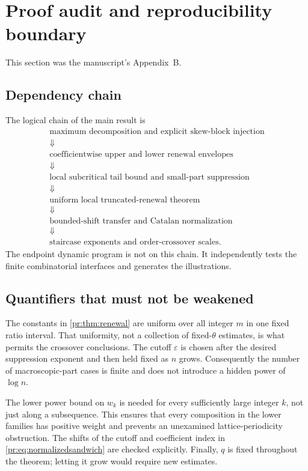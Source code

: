 \documentclass[11pt,a4paper]{article}
\theoremstyle{definition}\newaliascnt{definition}{theorem}
\theoremstyle{remark}\newaliascnt{remark}{theorem}
\begin{document}
\section{Proof audit and reproducibility boundary}
\label{pr:app:audit}
This section was the manuscript's Appendix~B.

\subsection{Dependency chain}
The logical chain of the main result is
\[
 \begin{gathered}
 \text{maximum decomposition and explicit skew-block injection}\\
 \Downarrow\\
 \text{coefficientwise upper and lower renewal envelopes}\\
 \Downarrow\\
 \text{local subcritical tail bound and small-part suppression}\\
 \Downarrow\\
 \text{uniform local truncated-renewal theorem}\\
 \Downarrow\\
 \text{bounded-shift transfer and Catalan normalization}\\
 \Downarrow\\
 \text{staircase exponents and order-crossover scales}.
 \end{gathered}
\]
The endpoint dynamic program is not on this chain. It independently tests
the finite combinatorial interfaces and generates the illustrations.

\subsection{Quantifiers that must not be weakened}
The constants in \cref{pr:thm:renewal} are uniform over all integer $m$ in
one fixed ratio interval. That uniformity, not a collection of fixed-$\theta$
estimates, is what permits the crossover conclusions. The cutoff
$\varepsilon$ is chosen after the desired suppression exponent and then held
fixed as $n$ grows. Consequently the number of macroscopic-part cases is
finite and does not introduce a hidden power of $\log n$.

The lower power bound on $w_k$ is needed for every sufficiently large integer
$k$, not just along a subsequence. This ensures that every composition in
the lower families has positive weight and prevents an unexamined
lattice-periodicity obstruction. The shifts of the cutoff and coefficient
index in \eqref{pr:eq:normalizedsandwich} are checked explicitly. Finally,
$q$ is fixed throughout the theorem; letting it grow would require new
estimates.
\end{document}
